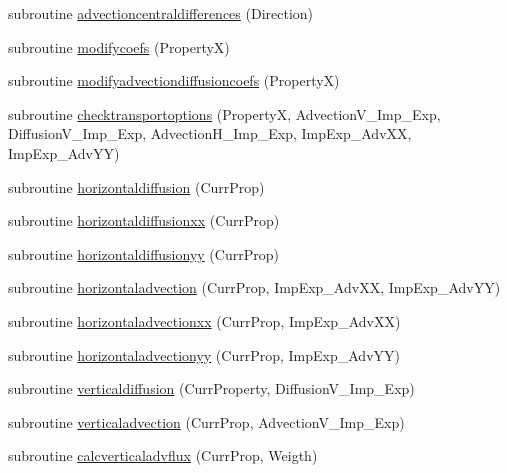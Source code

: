 \begin{DoxyCompactItemize}
subroutine \mbox{\hyperlink{namespacemoduleporousmediaproperties_a07904791ddeab6650d5a3ed4ee8eca5d}{advectioncentraldifferences}} (Direction)
\item 
subroutine \mbox{\hyperlink{namespacemoduleporousmediaproperties_adff3b6aa5d450f391ceaa763c275a82a}{modifycoefs}} (PropertyX)
\item 
subroutine \mbox{\hyperlink{namespacemoduleporousmediaproperties_aaeea83f4ec370391b45509fd7863a3bc}{modifyadvectiondiffusioncoefs}} (PropertyX)
\item 
subroutine \mbox{\hyperlink{namespacemoduleporousmediaproperties_a1f506b4d3d9d8a845ba272fe4a1b867e}{checktransportoptions}} (PropertyX, Advection\+V\+\_\+\+Imp\+\_\+\+Exp, Diffusion\+V\+\_\+\+Imp\+\_\+\+Exp, Advection\+H\+\_\+\+Imp\+\_\+\+Exp, Imp\+Exp\+\_\+\+Adv\+XX, Imp\+Exp\+\_\+\+Adv\+YY)
\item 
subroutine \mbox{\hyperlink{namespacemoduleporousmediaproperties_a46d137d0c183e1c9fcad5f72b1101ffd}{horizontaldiffusion}} (Curr\+Prop)
\item 
subroutine \mbox{\hyperlink{namespacemoduleporousmediaproperties_a3a2fc7f94588508e3f73f83cdb76a6af}{horizontaldiffusionxx}} (Curr\+Prop)
\item 
subroutine \mbox{\hyperlink{namespacemoduleporousmediaproperties_a9bd1af2c6e3a19167f538d7c25d74e6b}{horizontaldiffusionyy}} (Curr\+Prop)
\item 
subroutine \mbox{\hyperlink{namespacemoduleporousmediaproperties_a7327a640c1b4db8bbf9db21d1a859a88}{horizontaladvection}} (Curr\+Prop, Imp\+Exp\+\_\+\+Adv\+XX, Imp\+Exp\+\_\+\+Adv\+YY)
\item 
subroutine \mbox{\hyperlink{namespacemoduleporousmediaproperties_a8e5f48df8b88839f3c864bb3668c251a}{horizontaladvectionxx}} (Curr\+Prop, Imp\+Exp\+\_\+\+Adv\+XX)
\item 
subroutine \mbox{\hyperlink{namespacemoduleporousmediaproperties_a4de4628b721cc4ace9457a05e6b46f11}{horizontaladvectionyy}} (Curr\+Prop, Imp\+Exp\+\_\+\+Adv\+YY)
\item 
subroutine \mbox{\hyperlink{namespacemoduleporousmediaproperties_a872ba647c81cc1f00e69bd02b7418258}{verticaldiffusion}} (Curr\+Property, Diffusion\+V\+\_\+\+Imp\+\_\+\+Exp)
\item 
subroutine \mbox{\hyperlink{namespacemoduleporousmediaproperties_a0872f72bfebe157c1a7a7030f27bf43c}{verticaladvection}} (Curr\+Prop, Advection\+V\+\_\+\+Imp\+\_\+\+Exp)
\item 
subroutine \mbox{\hyperlink{namespacemoduleporousmediaproperties_a073f545385ee87d0157436c464e871fa}{calcverticaladvflux}} (Curr\+Prop, Weigth)

\end{DoxyCompactItemize}
